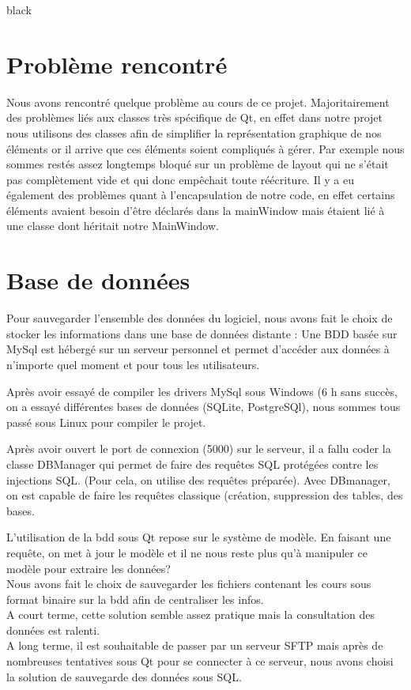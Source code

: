 {\begin{items}{black}{\Bullet}
\section{Problème rencontré}

Nous avons rencontré quelque problème au cours de ce projet. Majoritairement des problèmes liés aux classes très spécifique de Qt, en effet dans notre projet nous utilisons des classes afin de simplifier la représentation graphique de nos éléments or il arrive que ces éléments soient compliqués à gérer. Par exemple nous sommes restés assez longtemps bloqué sur un problème de layout qui ne s’était pas complètement vide et qui donc empêchait toute réécriture. Il y a eu également des problèmes quant à l’encapsulation de notre code, en effet certains éléments avaient besoin d’être déclarés dans la mainWindow mais étaient lié à une classe dont héritait notre MainWindow.


\section{Base de données}

Pour sauvegarder l'ensemble des données du logiciel, nous avons fait le choix de stocker les informations dans une base de données distante : Une BDD basée sur MySql est hébergé sur un serveur personnel et permet d'accéder aux données à n'importe quel moment et pour tous les utilisateurs.

Après avoir essayé de compiler les drivers MySql sous Windows (6 h sans succès, on a essayé différentes bases de données (SQLite, PostgreSQl), nous sommes tous passé sous Linux pour compiler le projet.


Après avoir ouvert le port de connexion (5000) sur le serveur, il a fallu coder la classe DBManager qui permet de faire des requêtes SQL protégées contre les injections SQL. (Pour cela, on utilise des requêtes préparée). 
Avec DBmanager, on est capable de faire les requêtes classique (création, suppression des tables, des bases. 

L'utilisation de la bdd sous Qt repose sur le système de modèle. En faisant une requête, on met à jour le modèle et il ne nous reste plus qu'à manipuler ce modèle pour extraire les données?\\


Nous avons fait le choix de sauvegarder les fichiers contenant les cours sous format binaire sur la bdd afin de centraliser les infos.\\
A court terme, cette solution semble assez pratique mais la consultation des données est ralenti.\\
A long terme, il est souhaitable de passer par un serveur SFTP mais après de nombreuses tentatives sous Qt pour se connecter à ce serveur, nous avons choisi la solution de sauvegarde des données sous SQL.\\


\end{items}}
